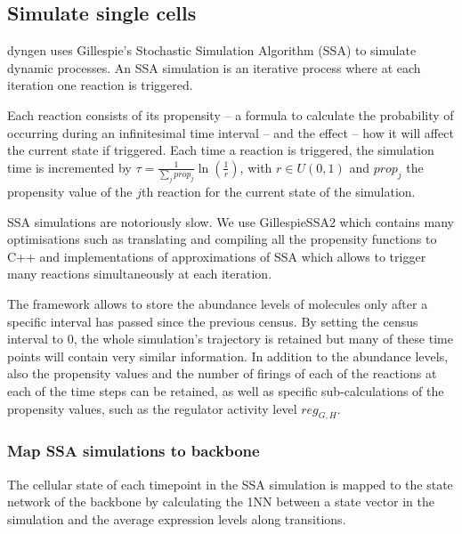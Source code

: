 \subsection{Simulate single cells} \label{sec:dyngen_ssa}



dyngen uses Gillespie's Stochastic Simulation Algorithm (SSA) to simulate dynamic processes. An SSA simulation is an iterative process where at each iteration one reaction is triggered. 

Each reaction consists of its propensity -- a formula to calculate the probability of occurring during an infinitesimal time interval -- and the effect -- how it will affect the current state if triggered. Each time a reaction is triggered, the simulation time is incremented by $\tau = \frac{1}{\sum_j prop_j} \ln\left(\frac{1}{r}\right)$, with $r \in U(0, 1)$ and $prop_j$ the propensity value of the $j$th reaction for the current state of the simulation.

SSA simulations are notoriously slow. We use GillespieSSA2 which contains many optimisations such as translating and compiling all the propensity functions to C++ and implementations of approximations of SSA which allows to trigger many reactions simultaneously at each iteration.

The framework allows to store the abundance levels of molecules only after a specific interval has passed since the previous census. By setting the census interval to 0, the whole simulation's trajectory is retained but many of these time points will contain very similar information. In addition to the abundance levels, also the propensity values and the number of firings of each of the reactions at each of the time steps can be retained, as well as specific sub-calculations of the propensity values, such as the regulator activity level $reg_{G,H}$. 

\subsubsection{Map SSA simulations to backbone}
The cellular state of each timepoint in the SSA simulation is mapped to the state network of the backbone by calculating the 1NN between a state vector in the simulation and the average expression levels along transitions.

